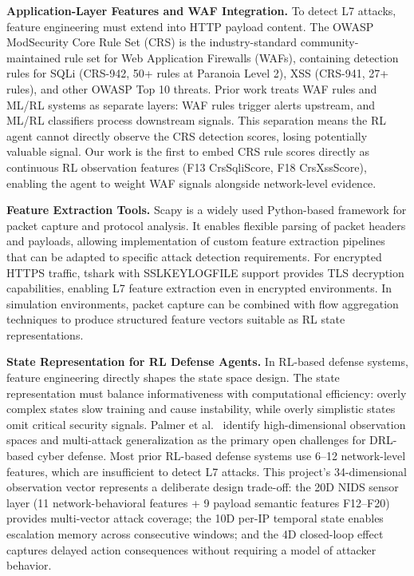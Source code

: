 \documentclass[12pt,a4paper]{report}
\begin{document}
\textbf{Application-Layer Features and WAF Integration.} To detect L7 attacks, feature engineering must extend into HTTP payload content. The OWASP ModSecurity Core Rule Set (CRS) \cite{owaspModSecCRS} is the industry-standard community-maintained rule set for Web Application Firewalls (WAFs), containing detection rules for SQLi (CRS-942, 50+ rules at Paranoia Level 2), XSS (CRS-941, 27+ rules), and other OWASP Top 10 threats. Prior work treats WAF rules and ML/RL systems as separate layers: WAF rules trigger alerts upstream, and ML/RL classifiers process downstream signals. This separation means the RL agent cannot directly observe the CRS detection scores, losing potentially valuable signal. Our work is the first to embed CRS rule scores directly as continuous RL observation features (F13 CrsSqliScore, F18 CrsXssScore), enabling the agent to weight WAF signals alongside network-level evidence.

\textbf{Feature Extraction Tools.} Scapy \cite{scapy2007} is a widely used Python-based framework for packet capture and protocol analysis. It enables flexible parsing of packet headers and payloads, allowing implementation of custom feature extraction pipelines that can be adapted to specific attack detection requirements. For encrypted HTTPS traffic, tshark with SSLKEYLOGFILE support provides TLS decryption capabilities, enabling L7 feature extraction even in encrypted environments. In simulation environments, packet capture can be combined with flow aggregation techniques to produce structured feature vectors suitable as RL state representations.

\textbf{State Representation for RL Defense Agents.} In RL-based defense systems, feature engineering directly shapes the state space design. The state representation must balance informativeness with computational efficiency: overly complex states slow training and cause instability, while overly simplistic states omit critical security signals. Palmer et al.\ \cite{palmer2023drlsurvey} identify high-dimensional observation spaces and multi-attack generalization as the primary open challenges for DRL-based cyber defense. Most prior RL-based defense systems use 6--12 network-level features, which are insufficient to detect L7 attacks. This project's 34-dimensional observation vector represents a deliberate design trade-off: the 20D NIDS sensor layer (11 network-behavioral features + 9 payload semantic features F12--F20) provides multi-vector attack coverage; the 10D per-IP temporal state enables escalation memory across consecutive windows; and the 4D closed-loop effect captures delayed action consequences without requiring a model of attacker behavior.
\end{document}
